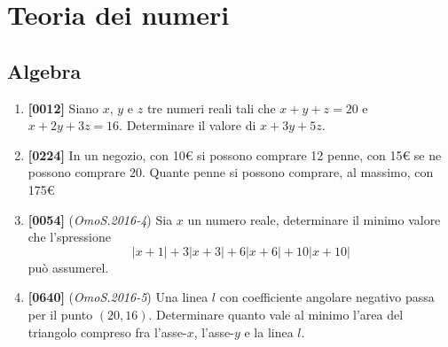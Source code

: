 \documentclass[10pt]{article}
\begin{document}
\newpage
\section{Teoria dei numeri}

\subsection{Algebra}
\begin{enumerate}
	\item \textbf{[0012]} Siano $x$, $y$ e $z$ tre numeri reali tali che $x+y+z=20$ e $x+2y+3z=16$. Determinare il valore di $x+3y+5z$.

	\item \textbf{[0224]} In un negozio, con 10€ si possono comprare 12 penne, con 15€ se ne possono comprare 20. Quante penne si possono comprare, al massimo, con 175€

	\item \textbf{[0054]} (\textit{OmoS.2016-4}) Sia $x$ un numero reale, determinare il minimo valore che l'spressione
		\begin{equation*}
			\lvert x+1 \rvert+3\lvert x+3 \rvert +6\lvert x+6 \rvert +10\lvert x+10\rvert
		\end{equation*}
		può assumerel.

	\item \textbf{[0640]} (\textit{OmoS.2016-5}) Una linea $l$ con coefficiente angolare negativo passa per il punto $(20,16)$. Determinare quanto vale al minimo l'area del triangolo compreso fra l'asse-$x$, l'asse-$y$ e la linea $l$.
\end{enumerate}
\end{document}
